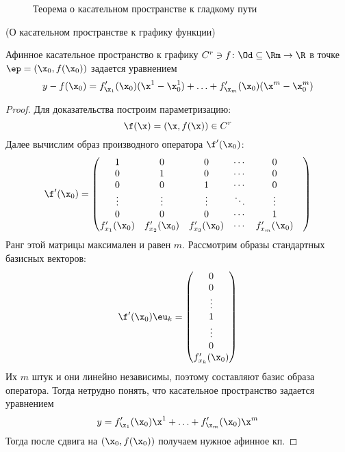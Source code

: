 \begin{figure}[ht]
    \centering
    \caption{Теорема о касательном пространстве к гладкому пути}
\end{figure}

\begin{theorem}(О касательном пространстве к графику функции)

    Афинное касательное пространство к графику $C^r \ni f \colon \Od \subseteq \Rm \to
    \R$ в точке $\ep = (\x_0, f(\x_0))$ задается уравнением
\[
    y - f(\x_0) = f'_{\x_1}(\x_0)(\x^1 - \x_0^1) + \ldots + f'_{\x_m}(\x_0)(\x^m - \x_0^m)
\]
\end{theorem}
\begin{proof}
    Для доказательства построим параметризацию:
\[
    \f(\x) = (\x, f(\x)) \in C^r
\]
    Далее вычислим образ производного оператора $\f'(\x_0)$:
\begin{align*}
    \f'(\x_0) = \begin{pmatrix}
              1 & 0 & 0 & \cdots & 0 \\
              0 & 1 & 0 & \cdots & 0 \\
              0 & 0 & 1 & \cdots & 0 \\
              \vdots & \vdots & \vdots & \ddots & \vdots & \\
              0 & 0 & 0 & \cdots & 1 \\
              f'_{x_1}(\x_0) & f'_{x_2}(\x_0) & f'_{x_3}(\x_0) & \cdots & f'_{x_m}(\x_0)
              \end{pmatrix}
\end{align*}
    Ранг этой матрицы максимален и равен $m$. Рассмотрим образы стандартных
    базисных векторов:
\[
    \f'(\x_0)\eu_k = \begin{pmatrix}
                        0 \\
                        0 \\
                        \vdots \\
                        1 \\
                        \vdots \\
                        0 \\
                        f'_{x_k}(\x_0)
                      \end{pmatrix}
\]
    Их $m$ штук и они линейно независимы, поэтому составляют базис образа
    оператора. Тогда нетрудно понять, что касательное пространство задается
    уравнением
\[
    y = f'_{\x_1}(\x_0)\x^1 + \ldots + f'_{\x_m}(\x_0)\x^m
\]
    Тогда после сдвига на $(\x_0, f(\x_0))$ получаем нужное афинное кп.
\end{proof}

